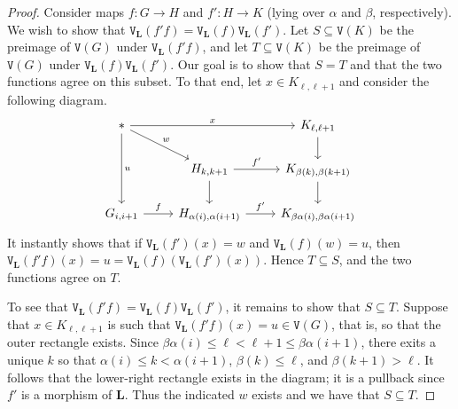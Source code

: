 \documentclass{amsart}
\numberwithin{theorem}{subsection}
\theoremstyle{definition}
\newcommand{\levelg}{\mathbf{L}}
\newcommand{\vertex}{\mathtt{V}}
\begin{document}
\begin{proof}
Consider maps $f \colon G \to H$ and $f' \colon H \to K$ (lying over $\alpha$ and $\beta$, respectively).
We wish to show that $\vertex_{\levelg}(f'f) = \vertex_{\levelg}(f)\vertex_{\levelg}(f')$. 
Let $S\subseteq \vertex(K)$ be the preimage of $\vertex(G)$ under $\vertex_{\levelg}(f'f)$, and let $T\subseteq \vertex(K)$ be the preimage of $\vertex(G)$ under $\vertex_{\levelg}(f)\vertex_{\levelg}(f')$.
Our goal is to show that $S=T$ and that the two functions agree on this subset.
To that end, let $x\in K_{\ell, \ell+1}$ and consider the following diagram.
\[ \begin{tikzcd}
\ast \arrow[rr, "x"] \arrow[dr, "w"] \arrow[dd, "u"] & & K_{\ell, \ell+1} \dar \\
& H_{k,k+1} \rar{f'} \dar & K_{\beta(k),\beta(k+1)} \dar \\
G_{i,i+1} \rar{f} & H_{\alpha(i),\alpha(i+1)} \rar{f'} & K_{\beta\alpha(i), \beta\alpha(i+1)}
\end{tikzcd} \]
It instantly shows that if $\vertex_{\levelg}(f') (x) = w$ and $\vertex_{\levelg}(f) (w) = u$, then $\vertex_{\levelg}(f'f)(x) = u = \vertex_{\levelg}(f) (\vertex_{\levelg}(f') (x))$.
Hence $T\subseteq S$, and the two functions agree on $T$.

To see that $\vertex_{\levelg}(f'f) = \vertex_{\levelg}(f)\vertex_{\levelg}(f')$, it remains to show that $S\subseteq T$.
Suppose that $x \in K_{\ell, \ell+1}$ is such that $\vertex_{\levelg}(f'f)(x) = u \in \vertex(G)$, that is, so that the outer rectangle exists.
Since $\beta \alpha(i) \leq \ell < \ell+1 \leq \beta\alpha(i+1)$, there exits a unique $k$ so that $\alpha(i) \leq k < \alpha(i+1)$, $\beta(k) \leq \ell$, and $\beta(k+1) > \ell$.
It follows that the lower-right rectangle exists in the diagram; it is a pullback since $f'$ is a morphism of $\levelg$.
Thus the indicated $w$ exists and we have that $S\subseteq T$.
\end{proof}
\end{document}
